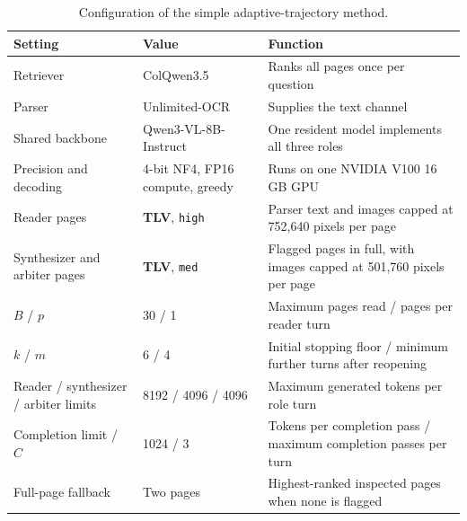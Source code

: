 \label{app:setup_details}

\begin{table}[h]
\centering
\small
\setlength{\tabcolsep}{5pt}
\begin{tabular}{@{}p{}p{}p{}@{}}
\toprule
Setting & Value & Function \\
\midrule
Retriever & ColQwen3.5 & Ranks all pages once per question \\
Parser & Unlimited-OCR & Supplies the text channel \\
Shared backbone & Qwen3-VL-8B-Instruct & One resident model implements all three roles \\
Precision and decoding & 4-bit NF4, FP16 compute, greedy & Runs on one NVIDIA V100 16\,GB GPU \\
Reader pages & \textbf{TLV}, \texttt{high} & Parser text and images capped at 752,640 pixels per page \\
Synthesizer and arbiter pages & \textbf{TLV}, \texttt{med} & Flagged pages in full, with images capped at 501,760 pixels per page \\
$B$ / $p$ & 30 / 1 & Maximum pages read / pages per reader turn \\
$k$ / $m$ & 6 / 4 & Initial stopping floor / minimum further turns after reopening \\
Reader / synthesizer / arbiter limits & 8192 / 4096 / 4096 & Maximum generated tokens per role turn \\
Completion limit / $C$ & 1024 / 3 & Tokens per completion pass / maximum completion passes per turn \\
Full-page fallback & Two pages & Highest-ranked inspected pages when none is flagged \\
\bottomrule
\end{tabular}
\caption{Configuration of the simple adaptive-trajectory method.}
\label{tab:app_validation_config}
\end{table}